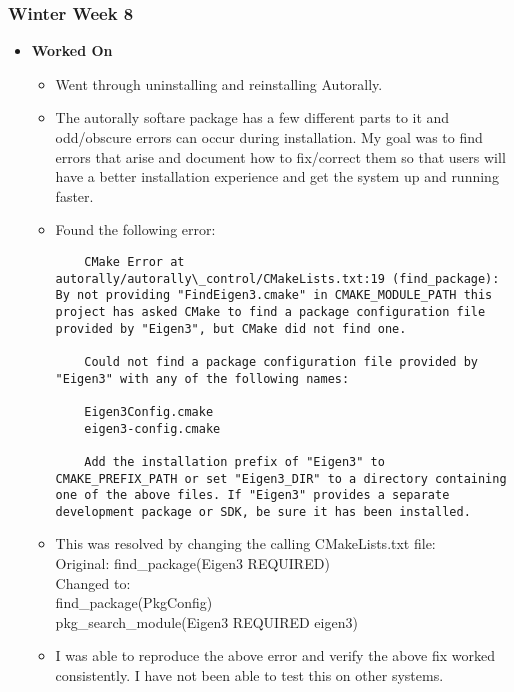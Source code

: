 \documentclass[compsoc,draftclsnofoot,onecolumn,10pt]{IEEEtran}
\begin{document}
\subsubsection{Winter Week 8}
\begin{itemize}
    \item {\textbf{Worked On}}
    \begin{itemize}
        \item Went through uninstalling and reinstalling Autorally.
        \item The autorally softare package has a few different parts to it and odd/obscure errors can occur during installation. My goal was to find errors that arise and document how to fix/correct them so that users will have a better installation experience and get the system up and running faster.

        \item Found the following error:
\begin{verbatim}
    CMake Error at autorally/autorally\_control/CMakeLists.txt:19 (find_package): By not providing "FindEigen3.cmake" in CMAKE_MODULE_PATH this project has asked CMake to find a package configuration file provided by "Eigen3", but CMake did not find one.

    Could not find a package configuration file provided by "Eigen3" with any of the following names:

    Eigen3Config.cmake
    eigen3-config.cmake
    
    Add the installation prefix of "Eigen3" to CMAKE_PREFIX_PATH or set "Eigen3_DIR" to a directory containing one of the above files. If "Eigen3" provides a separate development package or SDK, be sure it has been installed.
\end{verbatim}

    \item This was resolved by changing the calling CMakeLists.txt file:\\
    Original: find\_package(Eigen3 REQUIRED)\\
    Changed to:\\
    find\_package(PkgConfig)\\
    pkg\_search\_module(Eigen3 REQUIRED eigen3)\\
    
    \item I was able to reproduce the above error and verify the above fix worked consistently. I have not been able to test this on other systems.
    

\end{itemize}
\end{itemize}
\end{document}
